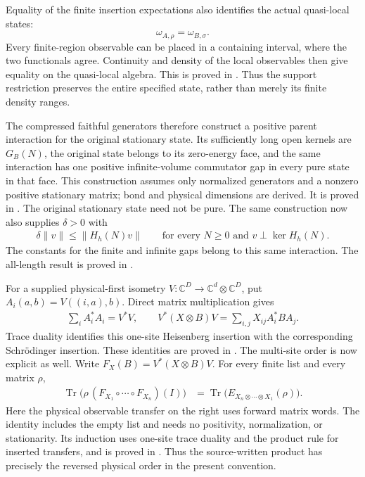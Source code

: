 \documentclass{article}
\begin{document}
Equality of the finite insertion expectations also identifies the actual
quasi-local states:
\[
 \omega_{A,\rho}=\omega_{B,\sigma}.
\]
Every finite-region observable can be placed in a containing interval, where
the two functionals agree. Continuity and density of the local observables
then give equality on the quasi-local algebra. This is proved in
.
Thus the support restriction preserves the entire specified state, rather
than merely its finite density ranges.

The compressed faithful generators therefore construct a positive parent
interaction for the original stationary state. Its sufficiently long open
kernels are $G_B(N)$, the original state belongs to its zero-energy face,
and the same interaction has one positive infinite-volume commutator gap
in every pure state in that face. This construction assumes only normalized
generators and a nonzero positive stationary matrix; bond and physical
dimensions are derived. It is proved in
.
The original stationary state need not be pure.
The same construction now also supplies $\delta>0$ with
\begin{align}
 \delta\|v\|\leq\|H_h(N)v\|
 \qquad\text{for every }N\geq0\text{ and }v\perp\ker H_h(N).
\end{align}
The constants for the finite and infinite gaps belong to this same
interaction. The all-length result is proved in
.

For a supplied physical-first isometry
$V:\mathbb C^D\to\mathbb C^d\otimes\mathbb C^D$, put
$A_i(a,b)=V((i,a),b)$. Direct matrix multiplication gives
\begin{align}
 \sum_iA_i^*A_i=V^*V,
 \qquad
 V^*(X\otimes B)V=\sum_{i,j}X_{ij}A_i^*BA_j.
\end{align}
Trace duality identifies this one-site Heisenberg insertion with the
corresponding Schr\"odinger insertion. These identities are proved in
.
The multi-site order is now explicit as well. Write
$F_X(B)=V^*(X\otimes B)V$. For every finite list and every matrix $\rho$,
\begin{align}
 \operatorname{Tr}\bigl(\rho\,(F_{X_1}\circ\cdots\circ F_{X_n})(I)\bigr)
 &=\operatorname{Tr}\bigl(E_{X_n\otimes\cdots\otimes X_1}(\rho)\bigr).
\end{align}
Here the physical observable transfer on the right uses forward matrix
words. The identity includes the empty list and needs no positivity,
normalization, or stationarity. Its induction uses one-site trace duality
and the product rule for inserted transfers, and is proved in
. Thus the
source-written product has precisely the reversed physical order in the
present convention.
\end{document}
